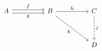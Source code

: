 \[\begin{tikzcd}
	A && B && C \\
	\\
	&&&& D
	\arrow["f", shift left, from=1-1, to=1-3]
	\arrow["g"', shift right, from=1-1, to=1-3]
	\arrow["h", from=1-3, to=1-5]
	\arrow["j", dashed, from=1-5, to=3-5]
	\arrow["k"', from=1-3, to=3-5]
\end{tikzcd}\]